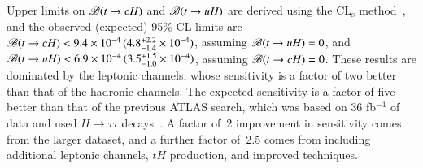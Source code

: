 Upper limits on $\mathscr{B}(t\rightarrow cH)$ and $\mathscr{B}(t\rightarrow uH)$ are derived using the CL$_{\textrm{s}}$ method~\cite{Junk:1999kv,Read:2002hq}, and  
the observed (expected) 95\% CL limits are 
$\mathscr{B}(t\rightarrow cH)<9.4 \times 10^{-4}\,(4.8^{+2.2}_{-1.4}\times10^{-4})$, assuming $\mathscr{B}(t\rightarrow uH)=0$, and $\mathscr{B}(t\rightarrow uH)<6.9 \times 10^{-4}\,(3.5^{+1.5}_{-1.0}\times10^{-4})$, assuming $\mathscr{B}(t\rightarrow cH)=0$.
These results are dominated by the leptonic channels, whose sensitivity is a factor of two better than that of the hadronic channels.
The expected sensitivity is a factor of five better than that of the previous ATLAS search, which was based on 36 fb$^{-1}$ of data and used $H\to \tau\tau$ decays~\cite{fcnc36}.
A factor of~2 improvement in sensitivity comes from the larger dataset, and a further factor of~2.5 comes from including
additional leptonic channels, $tH$ production, and improved techniques.

